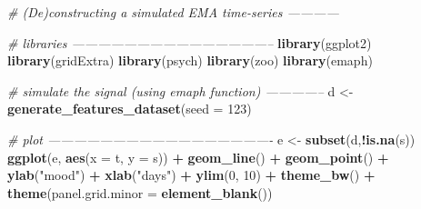 \documentclass[]{book}
\newenvironment{Shaded}{\begin{snugshade}}{\end{snugshade}}
\newcommand{\KeywordTok}[1]{\textcolor[rgb]{0.13,0.29,0.53}{\textbf{#1}}}
\newcommand{\DataTypeTok}[1]{\textcolor[rgb]{0.13,0.29,0.53}{#1}}
\newcommand{\DecValTok}[1]{\textcolor[rgb]{0.00,0.00,0.81}{#1}}
\newcommand{\StringTok}[1]{\textcolor[rgb]{0.31,0.60,0.02}{#1}}
\newcommand{\CommentTok}[1]{\textcolor[rgb]{0.56,0.35,0.01}{\textit{#1}}}
\newcommand{\OperatorTok}[1]{\textcolor[rgb]{0.81,0.36,0.00}{\textbf{#1}}}
\newcommand{\NormalTok}[1]{#1}
\begin{document}
\begin{Shaded}
\begin{Highlighting}[]
\CommentTok{# (De)constructing a simulated EMA time-series ------------}

\CommentTok{# libraries -----------------------------------------------}
\KeywordTok{library}\NormalTok{(ggplot2)}
\KeywordTok{library}\NormalTok{(gridExtra)}
\KeywordTok{library}\NormalTok{(psych)}
\KeywordTok{library}\NormalTok{(zoo)}
\KeywordTok{library}\NormalTok{(emaph)}

\CommentTok{# simulate the signal (using emaph function) --------------}
\NormalTok{d <-}\StringTok{ }\KeywordTok{generate_features_dataset}\NormalTok{(}\DataTypeTok{seed =} \DecValTok{123}\NormalTok{)}

\CommentTok{# plot ----------------------------------------------------}
\NormalTok{e <-}\StringTok{ }\KeywordTok{subset}\NormalTok{(d,}\OperatorTok{!}\KeywordTok{is.na}\NormalTok{(s))}
\KeywordTok{ggplot}\NormalTok{(e, }\KeywordTok{aes}\NormalTok{(}\DataTypeTok{x =}\NormalTok{ t, }\DataTypeTok{y =}\NormalTok{ s)) }\OperatorTok{+}
\StringTok{  }\KeywordTok{geom_line}\NormalTok{() }\OperatorTok{+}
\StringTok{  }\KeywordTok{geom_point}\NormalTok{() }\OperatorTok{+}
\StringTok{  }\KeywordTok{ylab}\NormalTok{(}\StringTok{"mood"}\NormalTok{) }\OperatorTok{+}\StringTok{ }\KeywordTok{xlab}\NormalTok{(}\StringTok{"days"}\NormalTok{) }\OperatorTok{+}
\StringTok{  }\KeywordTok{ylim}\NormalTok{(}\DecValTok{0}\NormalTok{, }\DecValTok{10}\NormalTok{) }\OperatorTok{+}
\StringTok{  }\KeywordTok{theme_bw}\NormalTok{() }\OperatorTok{+}\StringTok{ }\KeywordTok{theme}\NormalTok{(}\DataTypeTok{panel.grid.minor =} \KeywordTok{element_blank}\NormalTok{())}



\end{Highlighting}
\end{Shaded}
\end{document}
